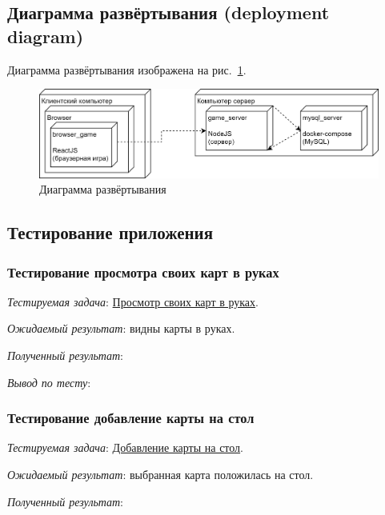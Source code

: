 \documentclass[12pt, a4paper, simple]{eskdtext}
\begin{document}
    \subsection{Диаграмма развёртывания (deployment diagram)}

    Диаграмма развёртывания изображена на рис.~\ref{fig:game__deployment_diagram}.

    \begin{figure}[!h]
        \centering
        \includegraphics[width=16cm]
            {../sources/game_architecture/build/game__deployment_diagram.png}
        \caption{Диаграмма развёртывания}
        \label{fig:game__deployment_diagram}
    \end{figure}

    \newpage
    \subsection{Тестирование приложения}


    \subsubsection*{Тестирование просмотра своих карт в руках}

    \textit{Тестируемая задача}: \underline{Просмотр своих карт в руках}.
    
    \textit{Ожидаемый результат}: видны карты в руках.

    \textit{Полученный результат}:

    \textit{Вывод по тесту}:


    \subsubsection*{Тестирование добавление карты на стол}

    \textit{Тестируемая задача}: \underline{Добавление карты на стол}.
    
    \textit{Ожидаемый результат}: выбранная карта положилась на стол.

    \textit{Полученный результат}:
\end{document}
